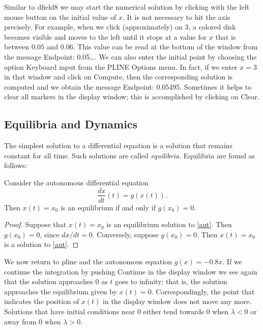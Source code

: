 \documentclass{ximera}
\begin{document}
Similar to {\sf dfield8} we may start the numerical solution by
clicking with the left mouse button on the initial value of $x$.
It is not necessary to hit the axis precisely.  For example,
when we click (approximately) on $3$, a colored disk becomes
visible and moves to the left until it stops at a value for $x$
that is between $0.05$ and $0.06$.  This value can be read at
the bottom of the window from the message {\sf Endpoint:
0.05\ldots}.  We can also enter the initial point by choosing
the option {\sf Keyboard input} from the {\sf PLINE Options}
menu.  In fact, if we enter $x=3$ in that window and click on
{\sf Compute}, then the corresponding solution is computed and
we obtain the message {\sf Endpoint: 0.05495}.  Sometimes it
helps to clear all markers in the display window; this is
accomplished by clicking on {\sf Clear}.

\subsection*{Equilibria and Dynamics}

The simplest solution to a differential equation is a solution
that remains constant for all time.  Such solutions are called
{\em equilibria\/}.  Equilibria are found as follows:
\begin{lemma}  \label{L:equilibria}
Consider the autonomous  differential equation
\begin{equation} \label{aut}
\frac{dx}{dt}(t) = g(x(t)).
\end{equation}
Then $x(t)=x_0$ is an equilibrium  if and only
if $g(x_0)=0$.
\end{lemma}

\begin{proof} Suppose that $x(t)=x_0$ is an equilibrium solution to
\eqref{aut}. Then $g(x_0)=0$, since $dx/dt = 0$.  Conversely,
suppose $g(x_0)=0$.  Then $x(t)=x_0$ is a solution to \eqref{aut}.
\end{proof}

We now return to {\sf pline} and the autonomous equation
$g(x)=-0.8x$.  If we continue the integration by pushing {\sf
Continue} in the display window we see again that the solution
approaches $0$ as $t$ goes to infinity; that is, the solution
approaches the equilibrium given by $x(t)=0$.  Correspondingly,
the point that indicates the position of $x(t)$ in the display
window does not move any more.  Solutions that have initial
conditions near $0$ either tend towards $0$ when $\lambda <
0$ or away from $0$ when $\lambda> 0$.
\end{document}
